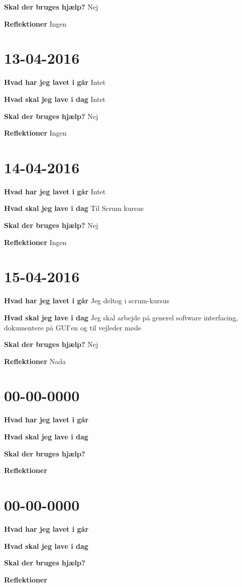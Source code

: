 \documentclass{article}
\begin{document}
	\textbf{Skal der bruges hjælp?} Nej
	
	\textbf{Reflektioner} Ingen
	
	\section{13-04-2016}
	
	\textbf{Hvad har jeg lavet i går} Intet
	
	\textbf{Hvad skal jeg lave i dag} Intet
	
	\textbf{Skal der bruges hjælp?} Nej
	
	\textbf{Reflektioner} Ingen	
	
	\section{14-04-2016}
	
	\textbf{Hvad har jeg lavet i går} Intet
	
	\textbf{Hvad skal jeg lave i dag} Til Scrum kursus
	
	\textbf{Skal der bruges hjælp?} Nej
	
	\textbf{Reflektioner} Ingen
		
	\section{15-04-2016}
	
	\textbf{Hvad har jeg lavet i går} Jeg deltog i scrum-kursus
	
	\textbf{Hvad skal jeg lave i dag} Jeg skal arbejde på generel software interfacing, dokumentere på GUI'en og til vejleder møde
	
	\textbf{Skal der bruges hjælp?} Nej
	
	\textbf{Reflektioner} Nada
	
	\section{00-00-0000}
	
	\textbf{Hvad har jeg lavet i går}
	
	\textbf{Hvad skal jeg lave i dag}
	
	\textbf{Skal der bruges hjælp?}
	
	\textbf{Reflektioner}
	
	\section{00-00-0000}
	
	\textbf{Hvad har jeg lavet i går}
	
	\textbf{Hvad skal jeg lave i dag}
	
	\textbf{Skal der bruges hjælp?}
	
	\textbf{Reflektioner}
	
		
\end{document}
